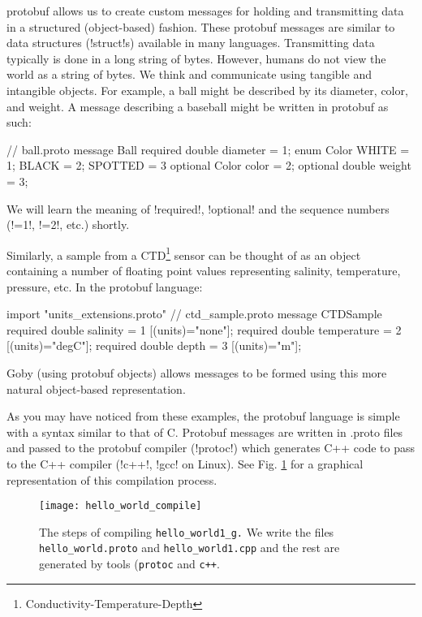  \gls{protobuf} allows us to create custom messages for holding and transmitting data in a structured (object-based) fashion. These protobuf messages are similar to data structures (!struct!s) available in many languages. Transmitting data typically is done in a long string of bytes. However, humans do not view the world as a string of bytes. We think and communicate using tangible and intangible objects. For example, a ball might be described by its diameter, color, and weight. A message describing a baseball might be written in protobuf as such:
\begin{boxedverbatim}
// ball.proto
message Ball
{
   required double diameter = 1;
   enum Color { WHITE = 1; BLACK = 2; SPOTTED = 3 }
   optional Color color = 2;
   optional double weight = 3;
}
\end{boxedverbatim}
\resetbvlinenumber
We will learn the meaning of !required!, !optional! and the sequence numbers (!=1!, !=2!, etc.) shortly.

Similarly, a sample from a CTD\footnote{Conductivity-Temperature-Depth} sensor can be thought of as an object containing a number of floating point values representing salinity, temperature, pressure, etc. In the \gls{protobuf} language:
\begin{boxedverbatim}
import "units_extensions.proto"
// ctd_sample.proto
message CTDSample
{
   required double salinity = 1 [(units)="none"];
   required double temperature = 2 [(units)="degC"];
   required double depth = 3 [(units)="m"];
}
\end{boxedverbatim}
\resetbvlinenumber
Goby (using protobuf objects) allows messages to be formed using this more natural object-based representation.

As you may have noticed from these examples, the \gls{protobuf} language is simple with a syntax similar to that of C. Protobuf messages are written in .proto files and passed to the protobuf compiler (!protoc!) which generates C++ code to pass to the C++ compiler (!c++!, !gcc! on Linux). See Fig. \ref{fig:hello_world_compile} for a graphical representation of this compilation process. 

\begin{figure}
\centering
\texttt{[image: hello\_world\_compile]}
\caption{The steps of compiling \texttt{hello\_world1\_g.} We write the files \texttt{hello\_world.proto} and \texttt{hello\_world1.cpp} and the rest are generated by tools (\texttt{protoc} and \texttt{c++}.}
\label{fig:hello_world_compile}
\end{figure}

